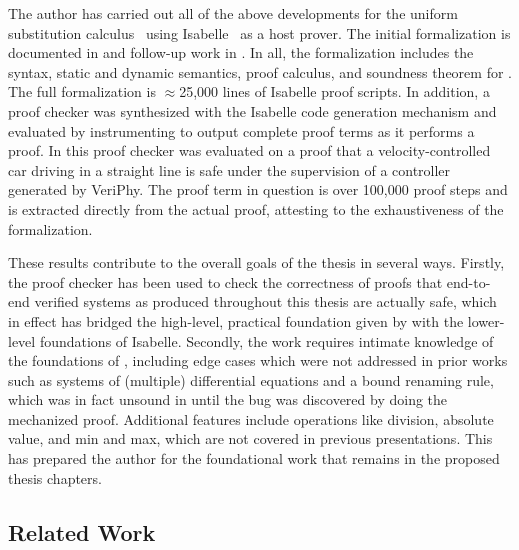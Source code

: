 \documentclass[12pt]{cmuthesis}
\theoremstyle{definition}
\theoremstyle{remark}
\newcommand{\VeriPhy}{VeriPhy\xspace}
\begin{document}
The author has carried out all of the above developments for the \dL uniform substitution calculus~\cite{DBLP:journals/jar/Platzer17} using Isabelle~\cite{ISABELLE} as a host prover.
The initial formalization is documented in \cite{DBLP:conf/cpp/BohrerRVVP17} and follow-up work in \cite{DBLP:conf/pldi/BohrerTMMP18}.
In all, the formalization includes the syntax, static and dynamic semantics, proof calculus, and soundness theorem for \dL.
The full formalization is $\approx$25,000 lines of Isabelle proof scripts.
In addition, a proof checker was synthesized with the Isabelle code generation mechanism and evaluated by instrumenting \KeYmaeraX to output complete proof terms as it performs a proof.
In \cite{DBLP:conf/pldi/BohrerTMMP18} this proof checker was evaluated on a proof that a velocity-controlled car driving in a straight line is safe under the supervision of a controller generated by \VeriPhy.
The proof term in question is over 100,000 proof steps and is extracted directly from the actual \KeYmaeraX proof, attesting to the exhaustiveness of the formalization.

These results contribute to the overall goals of the thesis in several ways.
Firstly, the proof checker has been used to check the correctness of \dL proofs that end-to-end verified systems as produced throughout this thesis are actually safe, which in effect has bridged the high-level, practical foundation given by \dL with the lower-level foundations of Isabelle.
Secondly, the work requires intimate knowledge of the foundations of \dL, including edge cases which were not addressed in prior works such as systems of (multiple) differential equations and a bound renaming rule, which was in fact unsound in \KeYmaeraX until the bug was discovered by doing the mechanized proof.
Additional features include operations like division, absolute value, and min and max, which are not covered in previous presentations.
This has prepared the author for the foundational work that remains in the proposed thesis chapters.

\subsection{Related Work}
\end{document}
